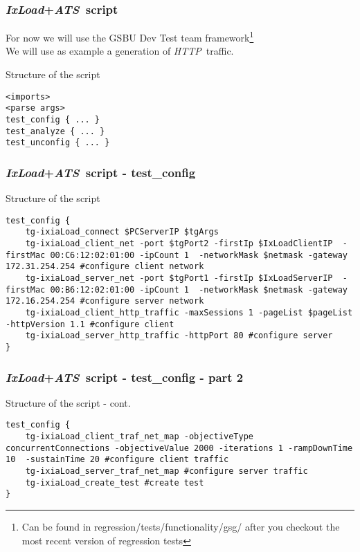 \documentclass{beamer}
\newcommand{\ixload}{\emph{IxLoad}}
\newcommand{\ats}{\emph{ATS}}
\newcommand{\http}{\emph{HTTP}}
\begin{document}
\begin{frame}[fragile] \frametitle{\ixload+\ats~script}
For now we will use the GSBU Dev Test team framework\footnote{Can be found in regression/tests/functionality/gsg/ after you checkout the most recent version of regression tests}\\
We will use as example a generation of \http~traffic.
\begin{block}{Structure of the script}
\begin{lstlisting}[language=TclUlisses]
<imports>
<parse args>
test_config { ... }
test_analyze { ... }
test_unconfig { ... }
\end{lstlisting}
\end{block}
\end{frame}

\begin{frame}[fragile] \frametitle{\ixload+\ats~script - test\_config}
\begin{block}{Structure of the script}
\begin{lstlisting}[language=TclUlisses]
test_config {
	tg-ixiaLoad_connect $PCServerIP $tgArgs
	tg-ixiaLoad_client_net -port $tgPort2 -firstIp $IxLoadClientIP  -firstMac 00:C6:12:02:01:00 -ipCount 1  -networkMask $netmask -gateway 172.31.254.254 #configure client network
	tg-ixiaLoad_server_net -port $tgPort1 -firstIp $IxLoadServerIP  -firstMac 00:B6:12:02:01:00 -ipCount 1  -networkMask $netmask -gateway 172.16.254.254 #configure server network
	tg-ixiaLoad_client_http_traffic -maxSessions 1 -pageList $pageList -httpVersion 1.1 #configure client
	tg-ixiaLoad_server_http_traffic -httpPort 80 #configure server
}
\end{lstlisting}
\end{block}
\end{frame}

\begin{frame}[fragile] \frametitle{\ixload+\ats~script - test\_config - part 2}
\begin{block}{Structure of the script - cont.}
\begin{lstlisting}[language=TclUlisses]
test_config {
	tg-ixiaLoad_client_traf_net_map -objectiveType concurrentConnections -objectiveValue 2000 -iterations 1 -rampDownTime 10  -sustainTime 20 #configure client traffic
	tg-ixiaLoad_server_traf_net_map #configure server traffic
	tg-ixiaLoad_create_test #create test
}
\end{lstlisting}
\end{block}
\end{frame}
\end{document}
